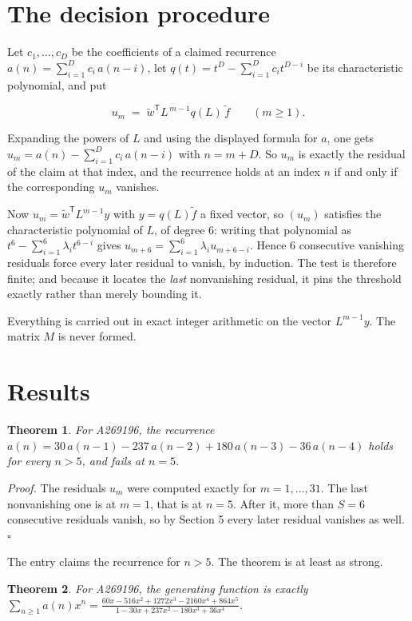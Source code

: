 \documentclass[11pt]{article}
\newtheorem{theorem}{Theorem}
\theoremstyle{definition}
\begin{document}
\section{The decision procedure}

Let $c_1,\dots,c_D$ be the coefficients of a claimed recurrence $a(n) = \sum_{i=1}^{D} c_i\,a(n-i)$, let $q(t) = t^{D} - \sum_{i=1}^{D} c_i t^{D-i}$ be its characteristic polynomial, and put

\[u_m \;=\; \tilde w^{\mathsf T} L^{\,m-1} q(L)\,\tilde f \qquad (m \ge 1).\]

Expanding the powers of $L$ and using the displayed formula for $a$, one gets $u_m = a(n) - \sum_{i=1}^{D} c_i\,a(n-i)$ with $n = m + D$. So $u_m$ is exactly the residual of the claim at that index, and the recurrence holds at an index $n$ if and only if the corresponding $u_m$ vanishes.

Now $u_m = \tilde w^{\mathsf T} L^{m-1} y$ with $y = q(L)\tilde f$ a fixed vector, so $(u_m)$ satisfies the characteristic polynomial of $L$, of degree $6$: writing that polynomial as $t^{6} - \sum_{i=1}^{6} \lambda_i t^{6-i}$ gives $u_{m+6} = \sum_{i=1}^{6} \lambda_i u_{m+6-i}$. Hence $6$ consecutive vanishing residuals force every later residual to vanish, by induction. The test is therefore finite; and because it locates the {\itshape last} nonvanishing residual, it pins the threshold exactly rather than merely bounding it.

Everything is carried out in exact integer arithmetic on the vector $L^{m-1}y$. The matrix $M$ is never formed.

\section{Results}

\begin{theorem} For A269196, the recurrence $a(n) = 30\,a(n-1) - 237\,a(n-2) + 180\,a(n-3) - 36\,a(n-4)$ holds for every $n > 5$, and fails at $n = 5$.\end{theorem}

{\itshape Proof.} The residuals $u_m$ were computed exactly for $m = 1,\dots,31$. The last nonvanishing one is at $m = 1$, that is at $n = 5$. After it, more than $S = 6$ consecutive residuals vanish, so by Section 5 every later residual vanishes as well. $\square$

The entry claims the recurrence for $n > 5$. The theorem is at least as strong.

\begin{theorem} For A269196, the generating function is exactly $\sum_{n\ge 1} a(n)x^n = \frac{60x - 516x^{2} + 1272x^{3} - 2160x^{4} + 864x^{5}}{1 - 30x + 237x^{2} - 180x^{3} + 36x^{4}}$.\end{theorem}
\end{document}
